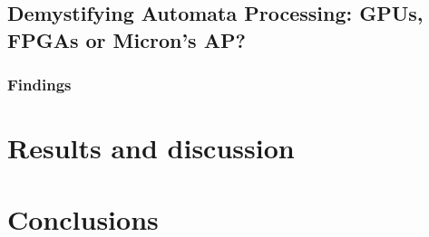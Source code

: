 \documentclass[10pt,onecolumn,twoside,english,a4paper]{article}
\begin{document}
\subsection{Demystifying Automata Processing: GPUs, FPGAs or Micron's AP?} \label{Nourian:DemystifyingFSA_analysis}

\subsubsection{Findings}


\section{Results and discussion} \label{Results}

\section{Conclusions} \label{Conclusions}




\end{document}
